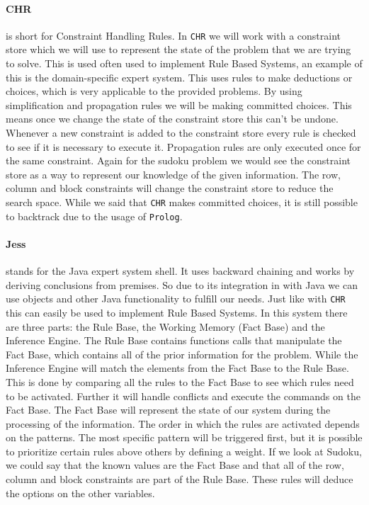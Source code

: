 \paragraph*{CHR} is short for Constraint Handling Rules. 
In \texttt{CHR} we will work with a constraint store which we will use to represent the state of the problem that we are trying to solve.
This is used often used to implement Rule Based Systems, an example of this is the domain-specific expert system.
This uses rules to make deductions or choices, which is very applicable to the provided problems. 
By using simplification and propagation rules we will be making committed choices. 
This means once we change the state of the constraint store this can't be undone.
Whenever a new constraint is added to the constraint store every rule is checked to see if it is necessary to execute it.
Propagation rules are only executed once for the same constraint.
Again for the sudoku problem we would see the constraint store as a way to represent our knowledge of the given information.
The row, column and block constraints will change the constraint store to reduce the search space.
While we said that \texttt{CHR} makes committed choices, it is still possible to backtrack due to the usage of \texttt{Prolog}.
 
\paragraph*{Jess} stands for the Java expert system shell.
It uses backward chaining and works by deriving conclusions from premises.
So due to its integration in with Java we can use objects and other Java functionality to fulfill our needs.
Just like with \texttt{CHR} this can easily be used to implement Rule Based Systems.
In this system there are three parts: the Rule Base, the Working Memory (Fact Base) and the Inference Engine.
The Rule Base contains functions calls that manipulate the Fact Base, which contains all of the prior information for the problem.
While the Inference Engine will match the elements from the Fact Base to the Rule Base.
This is done by comparing all the rules to the Fact Base to see which rules need to be activated.
Further it will handle conflicts and execute the commands on the Fact Base.
The Fact Base will represent the state of our system during the processing of the information.
The order in which the rules are activated depends on the patterns. 
The most specific pattern will be triggered first, but it is possible to prioritize certain rules above others by defining a weight.
If we look at Sudoku, we could say that the known values are the Fact Base and that all of the row, column and block constraints are part of the Rule Base.
These rules will deduce the options on the other variables.


